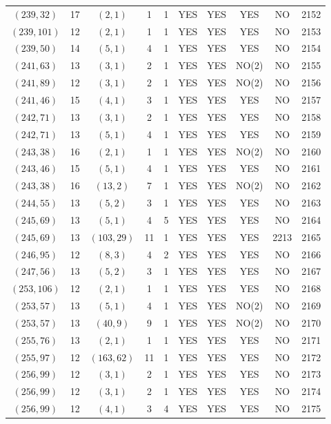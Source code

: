 \begin{longtable}{|c|c|c|c|c|c|c|c|c|c|}
$(239, 32)$ & 17 & $(2, 1)$ & 1 & 1 & YES & YES & YES & NO & 2152\\
$(239, 101)$ & 12 & $(2, 1)$ & 1 & 1 & YES & YES & YES & NO & 2153\\
$(239, 50)$ & 14 & $(5, 1)$ & 4 & 1 & YES & YES & YES & NO & 2154\\
$(241, 63)$ & 13 & $(3, 1)$ & 2 & 1 & YES & YES & NO(2) & NO & 2155\\
$(241, 89)$ & 12 & $(3, 1)$ & 2 & 1 & YES & YES & NO(2) & NO & 2156\\
$(241, 46)$ & 15 & $(4, 1)$ & 3 & 1 & YES & YES & YES & NO & 2157\\
$(242, 71)$ & 13 & $(3, 1)$ & 2 & 1 & YES & YES & YES & NO & 2158\\
$(242, 71)$ & 13 & $(5, 1)$ & 4 & 1 & YES & YES & YES & NO & 2159\\
$(243, 38)$ & 16 & $(2, 1)$ & 1 & 1 & YES & YES & NO(2) & NO & 2160\\
$(243, 46)$ & 15 & $(5, 1)$ & 4 & 1 & YES & YES & YES & NO & 2161\\
$(243, 38)$ & 16 & $(13, 2)$ & 7 & 1 & YES & YES & NO(2) & NO & 2162\\
$(244, 55)$ & 13 & $(5, 2)$ & 3 & 1 & YES & YES & YES & NO & 2163\\
$(245, 69)$ & 13 & $(5, 1)$ & 4 & 5 & YES & YES & YES & NO & 2164\\
$(245, 69)$ & 13 & $(103, 29)$ & 11 & 1 & YES & YES & YES & 2213 & 2165\\
$(246, 95)$ & 12 & $(8, 3)$ & 4 & 2 & YES & YES & YES & NO & 2166\\
$(247, 56)$ & 13 & $(5, 2)$ & 3 & 1 & YES & YES & YES & NO & 2167\\
$(253, 106)$ & 12 & $(2, 1)$ & 1 & 1 & YES & YES & YES & NO & 2168\\
$(253, 57)$ & 13 & $(5, 1)$ & 4 & 1 & YES & YES & NO(2) & NO & 2169\\
$(253, 57)$ & 13 & $(40, 9)$ & 9 & 1 & YES & YES & NO(2) & NO & 2170\\
$(255, 76)$ & 13 & $(2, 1)$ & 1 & 1 & YES & YES & YES & NO & 2171\\
$(255, 97)$ & 12 & $(163, 62)$ & 11 & 1 & YES & YES & YES & NO & 2172\\
$(256, 99)$ & 12 & $(3, 1)$ & 2 & 1 & YES & YES & YES & NO & 2173\\
$(256, 99)$ & 12 & $(3, 1)$ & 2 & 1 & YES & YES & YES & NO & 2174\\
$(256, 99)$ & 12 & $(4, 1)$ & 3 & 4 & YES & YES & YES & NO & 2175\\

\end{longtable}
